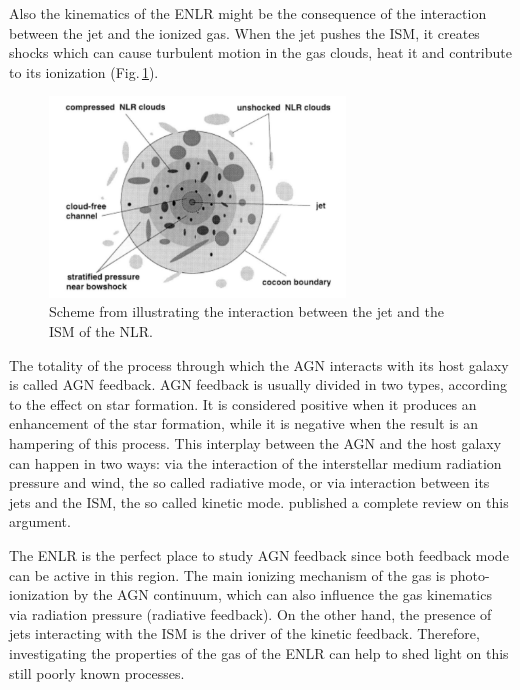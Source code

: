 \documentclass[../main.tex]{subfiles}
\begin{document}
Also the kinematics of the ENLR might be the consequence of the interaction between the jet and the ionized gas.
When the jet pushes the ISM, it creates shocks which can
cause turbulent motion in the gas clouds, heat it and contribute to its ionization \citep[e.g.][]{Steffen97,Morse98,Rodriguez05,Contini12,Congiu17} (Fig.\,\ref{fig:interaction}).

\begin{figure}
\centering
\includegraphics[width=0.7\textwidth]{images/Jet-ism.pdf} 
\caption[]{Scheme from \citet{Steffen97} illustrating the interaction between the jet and the ISM of the NLR.}
\label{fig:interaction}
\end{figure}

The totality of the process through which the AGN interacts with its host galaxy is called AGN feedback.
AGN feedback is usually divided in two types, according to the effect on star formation.
It is considered positive when it produces an enhancement of the star formation, while it is negative when the result is an hampering of this process.
This interplay between the AGN and the host galaxy can happen in two ways: via the interaction of the interstellar medium radiation pressure and wind, the so called radiative mode, or via interaction between its jets and the ISM, the so called kinetic mode.
\citet{Fabian12} published a complete review on this argument.

The ENLR is the perfect place to study AGN feedback since both feedback mode can be active in this region.
The main ionizing mechanism of the gas is photo-ionization by the AGN continuum, which can also influence the gas kinematics via radiation pressure (radiative feedback).
On the other hand, the presence of jets interacting with the ISM is the driver of the kinetic feedback.
Therefore, investigating the properties of the gas of the ENLR can help to shed light on this still poorly known processes.



























\biblio
\end{document}
